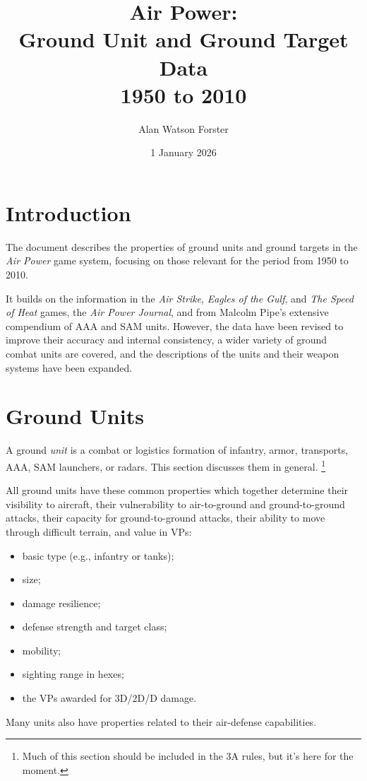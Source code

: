 \documentclass[10pt]{article}
\newcommand{\note}[1]{%
    \footnote{%
        \setlength{\parindent}{0pt}%
        \setlength{\parskip}{\smallskipamount}%
        #1
    }%
}
\begin{document}
\title{Air Power:\\[1ex] Ground Unit and Ground Target Data\\[1ex]
1950 to 2010}
\author{Alan Watson Forster}
\date{1 January 2026}

\maketitle

\thispagestyle{empty}

\section{Introduction}

The document describes the properties of ground units and ground targets in the \emph{Air Power} game system, focusing on those relevant for the period from 1950 to 2010.

It builds on the information in the \emph{Air Strike}, \emph{Eagles of the Gulf}, and \emph{The Speed of Heat} games, the \emph{Air Power Journal}, and from Malcolm Pipe's extensive compendium of AAA and SAM units. However, the data have been revised to improve their accuracy and internal consistency, a wider variety of ground combat units are covered, and the descriptions of the units and their weapon systems have been expanded.

\section{Ground Units}

A ground \emph{unit} is a combat or logistics formation of infantry, armor, transports, AAA, SAM launchers, or radars. This section discusses them in general.%
\note{
    Much of this section should be included in the 3A rules, but it's here for the moment.
}

All ground units have these common properties which together determine their visibility to aircraft, their vulnerability to air-to-ground and ground-to-ground attacks, their capacity for ground-to-ground attacks, their ability to move through difficult terrain, and value in VPs:
\begin{itemize}
    \item basic type (e.g., infantry or tanks);
    \item size;
    \item damage resilience;
    \item defense strength and target class;
    \item mobility;
    \item sighting range in hexes;
    \item the VPs awarded for 3D/2D/D damage.
\end{itemize}
Many units also have properties related to their air-defense capabilities.
\end{document}
